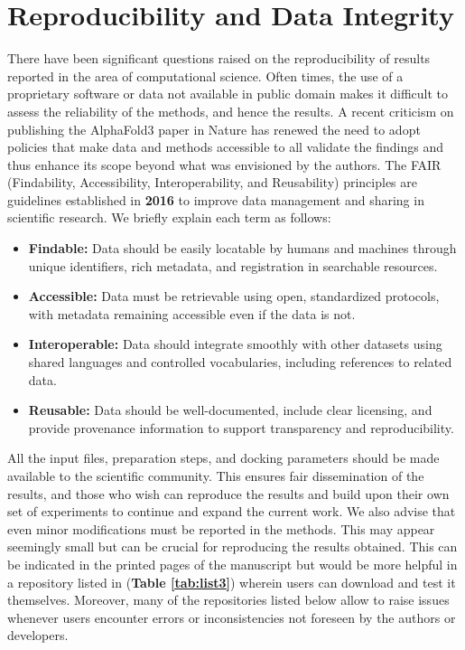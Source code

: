 \chapter*{Reproducibility and Data Integrity}

There have been significant questions raised on the reproducibility of results reported in the area of computational science\cite{bib58, bib59}. Often times, the use of a proprietary software or data not available in public domain makes it difficult to assess the reliability of the methods, and hence the results. A recent criticism on publishing the AlphaFold3 paper in Nature\cite{bib57} has renewed the need to adopt policies that make data and methods accessible to all validate the findings and thus enhance its scope beyond what was envisioned by the authors. The FAIR (Findability, Accessibility, Interoperability, and Reusability) principles are guidelines established in \textbf{2016} to improve data management and sharing in scientific research\cite{bib60}. 
We briefly explain each term as follows: 
\begin{itemize}
    \item \textbf{Findable:} Data should be easily locatable by humans and machines through unique identifiers, rich metadata, and registration in searchable resources.
    \item \textbf{Accessible:} Data must be retrievable using open, standardized protocols, with metadata remaining accessible even if the data is not.
    \item \textbf{Interoperable:} Data should integrate smoothly with other datasets using shared languages and controlled vocabularies, including references to related data.
    \item \textbf{Reusable:} Data should be well-documented, include clear licensing, and provide provenance information to support transparency and reproducibility.
\end{itemize}

All the input files, preparation steps, and docking parameters should be made available to the scientific community. This ensures fair dissemination of the results, and those who wish can reproduce the results and build upon their own set of experiments to continue and expand the current work. We also advise that even minor modifications must be reported in the methods. This may appear seemingly small but can be crucial for reproducing the results obtained. This can be indicated in the printed pages of the manuscript but would be more helpful in a repository listed in (\textbf{Table \ref{tab:list3}}) wherein users can download and test it themselves. Moreover, many of the repositories listed below allow to raise issues whenever users encounter errors or inconsistencies not foreseen by the authors or developers. 

